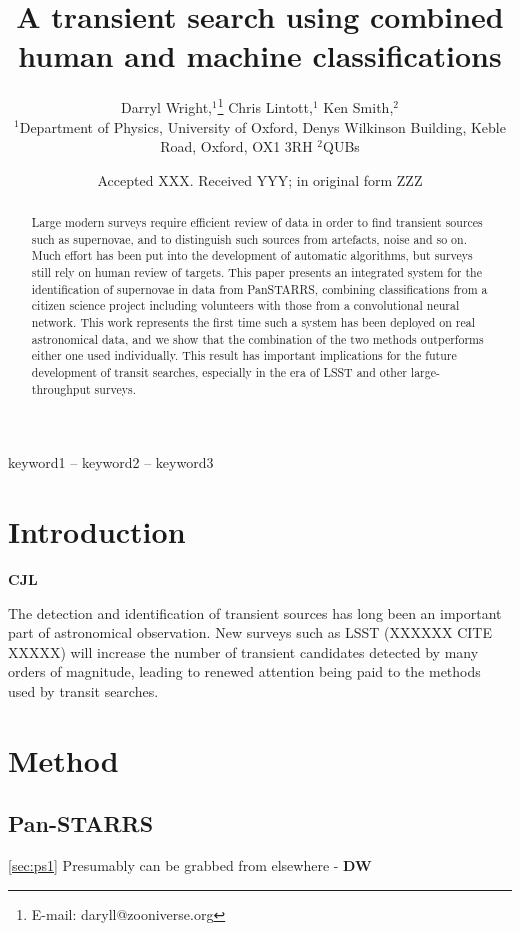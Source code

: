 \documentclass[a4paper,fleqn,usenatbib]{mnras}
\title[Human and machine classifications]{A transient search using combined human and machine classifications}
\author[D. Wright, C. Lintott, K. Smith et al.]{
Darryl Wright,$^{1}$\thanks{E-mail: daryll@zooniverse.org}
Chris Lintott,$^{1}$
Ken Smith,$^{2}$
\\
$^{1}$Department of Physics, University of Oxford, Denys Wilkinson Building, Keble Road, Oxford, OX1 3RH
$^{2}$QUBs
}
\date{Accepted XXX. Received YYY; in original form ZZZ}
\begin{document}
\label{firstpage}
\pagerange{\pageref{firstpage}--\pageref{lastpage}}
\maketitle

\begin{abstract}
Large modern surveys require efficient review of data in order to find transient sources such as supernovae, and to distinguish such sources from artefacts, noise and so on. Much effort has been put into the development of automatic algorithms, but surveys still rely on human review of targets. This paper presents an integrated system for the identification of supernovae in data from PanSTARRS, combining classifications from a citizen science project including volunteers with those from a convolutional neural network. This work represents the first time such a system has been deployed on real astronomical data, and we show that the combination of the two methods outperforms either one used individually. This result has important implications for the future development of transit searches, especially in the era of LSST and other large-throughput surveys. 
\end{abstract}

\begin{keywords}
keyword1 -- keyword2 -- keyword3
\end{keywords}



\section{Introduction}

\textbf{CJL}

The detection and identification of transient sources has long been an important part of astronomical observation. New surveys such as LSST (XXXXXX CITE XXXXX) will increase the number of transient candidates detected by many orders of magnitude, leading to renewed attention being paid to the methods used by transit searches. 




\section{Method}
\subsection{Pan-STARRS}
\ref{sec:ps1}
Presumably can be grabbed from elsewhere - \textbf{DW}
\end{document}
